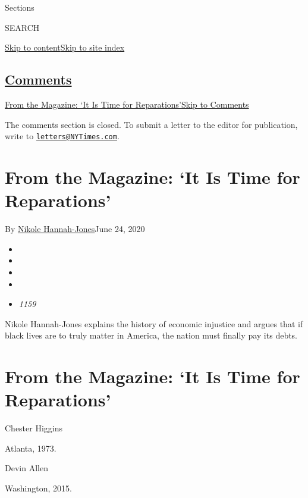 Sections

SEARCH

\protect\hyperlink{site-content}{Skip to
content}\protect\hyperlink{site-index}{Skip to site index}

\hypertarget{comments}{%
\subsection{\texorpdfstring{\protect\hyperlink{commentsContainer}{Comments}}{Comments}}\label{comments}}

\href{}{From the Magazine: `It Is Time for Reparations'}\href{}{Skip to
Comments}

The comments section is closed. To submit a letter to the editor for
publication, write to
\href{mailto:letters@NYTimes.com}{\nolinkurl{letters@NYTimes.com}}.

\hypertarget{from-the-magazine-it-is-time-for-reparations}{%
\section{From the Magazine: `It Is Time for
Reparations'}\label{from-the-magazine-it-is-time-for-reparations}}

By
\href{https://www.nytimes3xbfgragh.onion/by/nikole-hannah-jones}{Nikole
Hannah-Jones}June 24, 2020

\begin{itemize}
\item
\item
\item
\item
\item
  \emph{1159}
\end{itemize}

Nikole Hannah-Jones explains the history of economic injustice and
argues that if black lives are to truly matter in America, the nation
must finally pay its debts.

\hypertarget{from-the-magazine-it-is-time-for-reparations-1}{%
\section{From the Magazine: `It Is Time for
Reparations'}\label{from-the-magazine-it-is-time-for-reparations-1}}

Chester Higgins

Atlanta, 1973.

Devin Allen

Washington, 2015.

